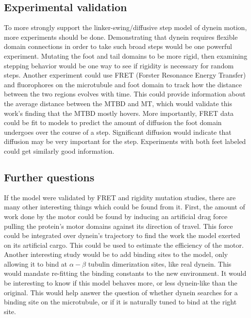 \documentclass[
11pt, %
english, %
singlespacing, %
headsepline, %
chapterinoneline, %
]{MastersDoctoralThesis} %
\begin{document}
\subsection{Experimental validation}
To more strongly support the linker-swing/diffusive step model of dynein motion, more experiments should be done. Demonstrating that dynein requires flexible domain connections in order to take such broad steps would be one powerful experiment. Mutating the foot and tail domains to be more rigid, then examining stepping behavior would be one way to see if rigidity is necessary for random steps. Another experiment could use FRET (Forster Resonance Energy Transfer) and fluorophores on the microtubule and foot domain to track how the distance between the two regions evolves with time. This could provide information about the average distance between the MTBD and MT, which would validate this work's finding that the MTBD mostly hovers. More importantly, FRET data could be fit to models to predict the amount of diffusion the foot domain undergoes over the course of a step. Significant diffusion would indicate that diffusion may be very important for the step. Experiments with both feet labeled could get similarly good information.\\


\subsection{Further questions}
If the model were validated by FRET and rigidity mutation studies, there are many other interesting things which could be found from it. First, the amount of work done by the motor could be found by inducing an artificial drag force pulling the protein's motor domains against its direction of travel. This force could be integrated over dynein's trajectory to find the work the model exerted on its artificial cargo. This could be used to estimate the efficiency of the motor. Another interesting study would be to add binding sites to the model, only allowing it to bind at $\alpha-\beta$ tubulin dimerization sites, like real dynein. This would mandate re-fitting the binding constants to the new environment. It would be interesting to know if this model behaves more, or less dynein-like than the original. This would help answer the question of whether dynein searches for a binding site on the microtubule, or if it is naturally tuned to bind at the right site.\\
\end{document}
